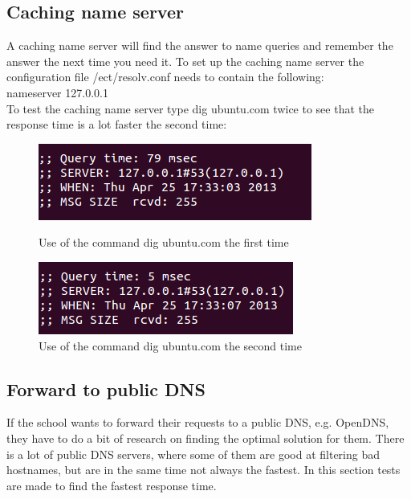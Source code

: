 \documentclass[a4paper,10pt]{report}
\newcommand{\code}[1]{{\fontfamily{pcr}\selectfont #1}}
\begin{document}
\subsection{Caching name server}
A caching name server will find the answer to name queries and remember the answer the next time you need it. To set up the caching name server the configuration file /ect/resolv.conf needs to contain the following:\\ \code{nameserver 127.0.0.1}\\
To test the caching name server type \code{dig ubuntu.com} twice to see that the response time is a lot faster the second time:

\begin{figure}[H]
\begin{minipage}[b]{0.45\linewidth}
\centering
\includegraphics[width=\textwidth]{dig1}
\caption{Use of the command \code{dig ubuntu.com} the first time}
\label{fig:dig1}
\end{minipage}
\hspace{0.5cm}
\begin{minipage}[b]{0.45\linewidth}
\centering
\includegraphics[width=\textwidth]{dig2}
\caption{Use of the command \code{dig ubuntu.com} the second time}
\label{fig:dig2}
\end{minipage}
\end{figure}

\subsection{Forward to public DNS}
If the school wants to forward their requests to a public DNS, e.g. OpenDNS, they have to do a bit of research on finding the optimal solution for them. 
There is a lot of public DNS servers, where some of them are good at filtering bad hostnames, but are in the same time not always the fastest.
In this section tests are made to find the fastest response time.
\end{document}

